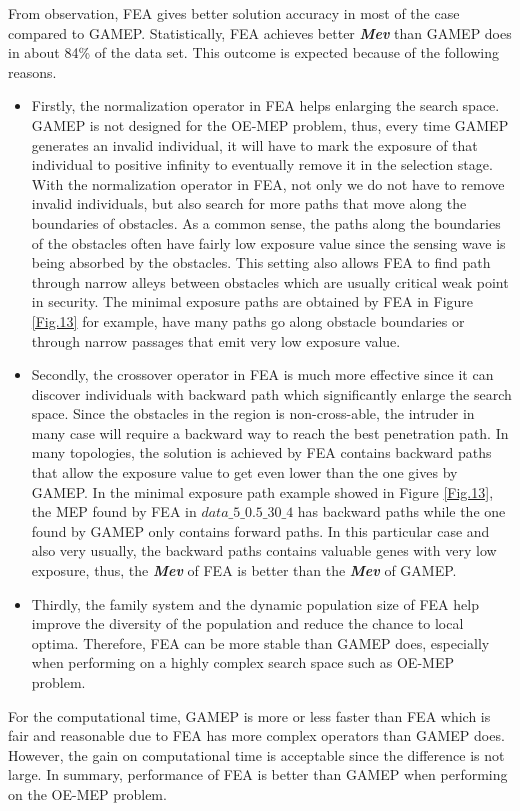 \documentclass[final]{elsarticle}
\begin{document}
From observation, FEA gives better solution accuracy in most of the case compared to GAMEP. Statistically, FEA achieves better \textit{\textbf{Mev}} than GAMEP does in about 84\% of the data set. This outcome is expected because of  the following reasons.
\begin{itemize}
	\item Firstly, the normalization operator in FEA helps enlarging the search space. GAMEP is not designed for the OE-MEP problem, thus, every time GAMEP generates an invalid individual, it will have to mark the exposure of that individual to positive infinity to eventually remove it in the selection stage. With the normalization operator in FEA, not only we do not have to remove invalid individuals, but also search for more paths that move along the boundaries of obstacles. As a common sense, the paths along the boundaries of the obstacles often have fairly low exposure value since the sensing wave is being absorbed by the obstacles. This setting also allows FEA to find path through narrow alleys between obstacles which are usually critical weak point in security. The minimal exposure paths are obtained by FEA in Figure \ref{Fig.13} for example, have many paths go along obstacle boundaries or through narrow passages that emit very low exposure value.
	\item Secondly, the crossover operator in FEA is much more effective since it can discover individuals with backward path which significantly enlarge the search space. Since the obstacles in the region is non-cross-able, the intruder in many case will require a backward way to reach the best penetration path. In many topologies, the solution is achieved by FEA contains backward paths that allow the exposure value to get even lower than the one gives by GAMEP. In the minimal exposure path example showed in Figure \ref{Fig.13}, the MEP found by FEA in $data\_5\_0.5\_30\_4 $ has backward paths while the one found by GAMEP only contains forward paths. In this particular case and also very usually, the backward paths contains valuable genes with very low exposure, thus, the \textbf{\textit{Mev}} of FEA is better than the \textbf{\textit{Mev}} of GAMEP. 
	\item Thirdly, the family system and the dynamic population size of FEA help improve the diversity of the population and reduce the chance to local optima. Therefore, FEA can be more stable than GAMEP does, especially when performing on a highly complex search space such as OE-MEP problem. 
\end{itemize}
For the computational time, GAMEP is more or less faster than FEA which is fair and reasonable due to FEA has more complex operators than GAMEP does. However, the gain on computational time is acceptable since the difference is not large. In summary, performance of FEA is better than GAMEP when performing on the OE-MEP problem. 
\end{document}
